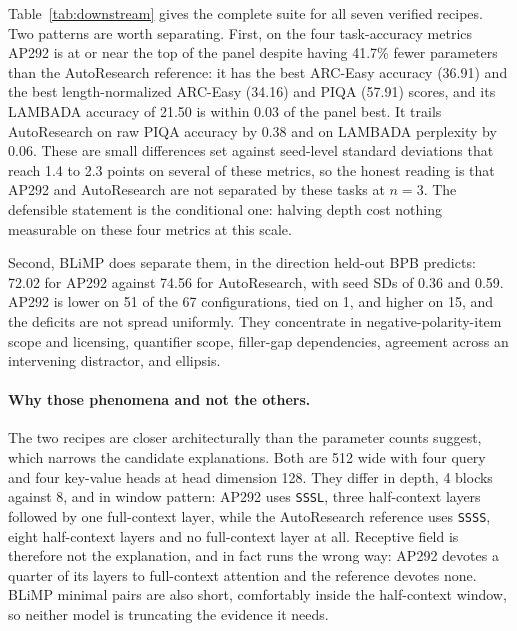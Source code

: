 \documentclass{article}
\begin{document}
Table~\ref{tab:downstream} gives the complete suite for all seven verified recipes. Two patterns are worth separating. First, on the four task-accuracy metrics AP292 is at or near the top of the panel despite having 41.7\% fewer parameters than the AutoResearch reference: it has the best ARC-Easy accuracy (36.91) and the best length-normalized ARC-Easy (34.16) and PIQA (57.91) scores, and its LAMBADA accuracy of 21.50 is within 0.03 of the panel best. It trails AutoResearch on raw PIQA accuracy by 0.38 and on LAMBADA perplexity by 0.06. These are small differences set against seed-level standard deviations that reach 1.4 to 2.3 points on several of these metrics, so the honest reading is that AP292 and AutoResearch are not separated by these tasks at $n=3$. The defensible statement is the conditional one: halving depth cost nothing measurable on these four metrics at this scale.

Second, BLiMP does separate them, in the direction held-out BPB predicts: 72.02 for AP292 against 74.56 for AutoResearch, with seed SDs of 0.36 and 0.59. AP292 is lower on 51 of the 67 configurations, tied on 1, and higher on 15, and the deficits are not spread uniformly. They concentrate in negative-polarity-item scope and licensing, quantifier scope, filler-gap dependencies, agreement across an intervening distractor, and ellipsis.

\paragraph{Why those phenomena and not the others.} The two recipes are closer architecturally than the parameter counts suggest, which narrows the candidate explanations. Both are 512 wide with four query and four key-value heads at head dimension 128. They differ in depth, 4 blocks against 8, and in window pattern: AP292 uses \texttt{SSSL}, three half-context layers followed by one full-context layer, while the AutoResearch reference uses \texttt{SSSS}, eight half-context layers and no full-context layer at all. Receptive field is therefore not the explanation, and in fact runs the wrong way: AP292 devotes a quarter of its layers to full-context attention and the reference devotes none. BLiMP minimal pairs are also short, comfortably inside the half-context window, so neither model is truncating the evidence it needs.
\end{document}

